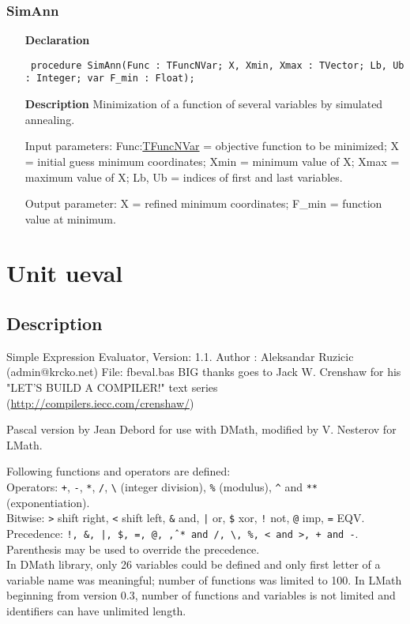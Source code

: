 \documentclass[12pt,a4paper,oneside]{report}
\newcommand{\declarationitem}[1]{\textbf{#1}}
\newcommand{\descriptiontitle}[1]{\textbf{#1}}
\newcommand{\code}[1]{\texttt{#1}}
\begin{document}
\subsubsection{SimAnn}
\label{usimann-SimAnn}
\begin{itemize}\item[\declarationitem{Declaration}\hfill]
	\begin{flushleft}
		\code{
			procedure SimAnn(Func : TFuncNVar; X, Xmin, Xmax : TVector; Lb, Ub : Integer; var F{\_}min : Float);}
		
	\end{flushleft}
	
	\par
	\item[\descriptiontitle{Description}]
	Minimization of a function of several variables by simulated annealing.
	
	Input parameters: Func:\hyperref[utypes-TFuncNVar]{TFuncNVar} = objective function to be minimized; X = initial guess minimum coordinates; Xmin = minimum value of X; Xmax = maximum value of X; Lb, Ub = indices of first and last variables.
	
	Output parameter: X = refined minimum coordinates; F{\_}min = function value at minimum.
	
\end{itemize}

\section{Unit ueval}
\label{ueval}
\subsection{Description}
Simple Expression Evaluator, Version: 1.1.
Author : Aleksandar Ruzicic (admin@krcko.net) File: fbeval.bas
BIG thanks goes to Jack W. Crenshaw for his "LET'S BUILD A COMPILER!" text series\\ (\href{http://compilers.iecc.com/crenshaw/}{http://compilers.iecc.com/crenshaw/})

Pascal version by Jean Debord for use with DMath, modified by V. Nesterov for LMath.

Following functions and operators are defined:\\[6pt] 
Operators: \code{+}, \code{-}, \code{*}, \code{/}, \code{\textbackslash} (integer division), \code{\%} (modulus), \code{\^} and \code{**} (exponentiation).\\[6pt]
Bitwise: \code{>} shift right, \code{<} shift left, \code{\&} and, \code{|} or, \code{\$} xor, \code{!} not, \code{@} imp, \code{=} EQV.\\[6pt]
Precedence: \code{!, \&, |, \$, =, @, \^, * and /, \textbackslash, \%, < and >, + and -}.\\
Parenthesis may be used to override the precedence.\\[6pt]
In DMath library, only 26 variables could be defined and only first letter of a variable name was meaningful; number of functions was limited to 100. In LMath beginning from version 0.3, number of functions and variables is not limited and identifiers can have unlimited length.
\end{document}
